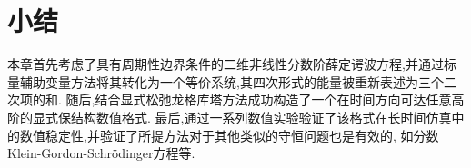 \section{小结}\label{Section_SAVRRK: 7}
本章首先考虑了具有周期性边界条件的二维非线性分数阶薛定谔波方程,并通过标量辅助变量方法将其转化为一个等价系统,其四次形式的能量被重新表述为三个二次项的和.
随后,结合显式松弛龙格库塔方法成功构造了一个在时间方向可达任意高阶的显式保结构数值格式.
最后,通过一系列数值实验验证了该格式在长时间仿真中的数值稳定性,并验证了所提方法对于其他类似的守恒问题也是有效的,
如分数Klein-Gordon-Schr{\"o}dinger方程等.



	


